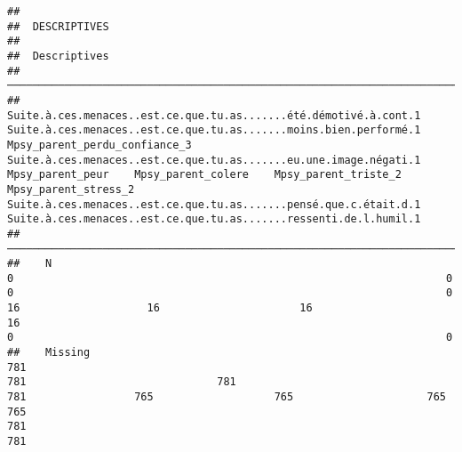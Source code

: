\documentclass[
]{article}
\begin{document}
\begin{verbatim}
## 
##  DESCRIPTIVES
## 
##  Descriptives                                                                                                                                                                                                                                                                                                                                                                                                                                                                                    
##  ─────────────────────────────────────────────────────────────────────────────────────────────────────────────────────────────────────────────────────────────────────────────────────────────────────────────────────────────────────────────────────────────────────────────────────────────────────────────────────────────────────────────────────────────────────────────────────────────────────────────────────────────────────────────────────────────────────────────────────────────── 
##               Suite.à.ces.menaces..est.ce.que.tu.as.......été.démotivé.à.cont.1    Suite.à.ces.menaces..est.ce.que.tu.as.......moins.bien.performé.1    Mpsy_parent_perdu_confiance_3    Suite.à.ces.menaces..est.ce.que.tu.as.......eu.une.image.négati.1    Mpsy_parent_peur    Mpsy_parent_colere    Mpsy_parent_triste_2    Mpsy_parent_stress_2    Suite.à.ces.menaces..est.ce.que.tu.as.......pensé.que.c.était.d.1    Suite.à.ces.menaces..est.ce.que.tu.as.......ressenti.de.l.humil.1   
##  ─────────────────────────────────────────────────────────────────────────────────────────────────────────────────────────────────────────────────────────────────────────────────────────────────────────────────────────────────────────────────────────────────────────────────────────────────────────────────────────────────────────────────────────────────────────────────────────────────────────────────────────────────────────────────────────────────────────────────────────────── 
##    N                                                                          0                                                                    0                                0                                                                    0                  16                    16                      16                      16                                                                    0                                                                    0   
##    Missing                                                                  781                                                                  781                              781                                                                  781                 765                   765                     765                     765                                                                  781                                                                  781   

\end{verbatim}
\end{document}
